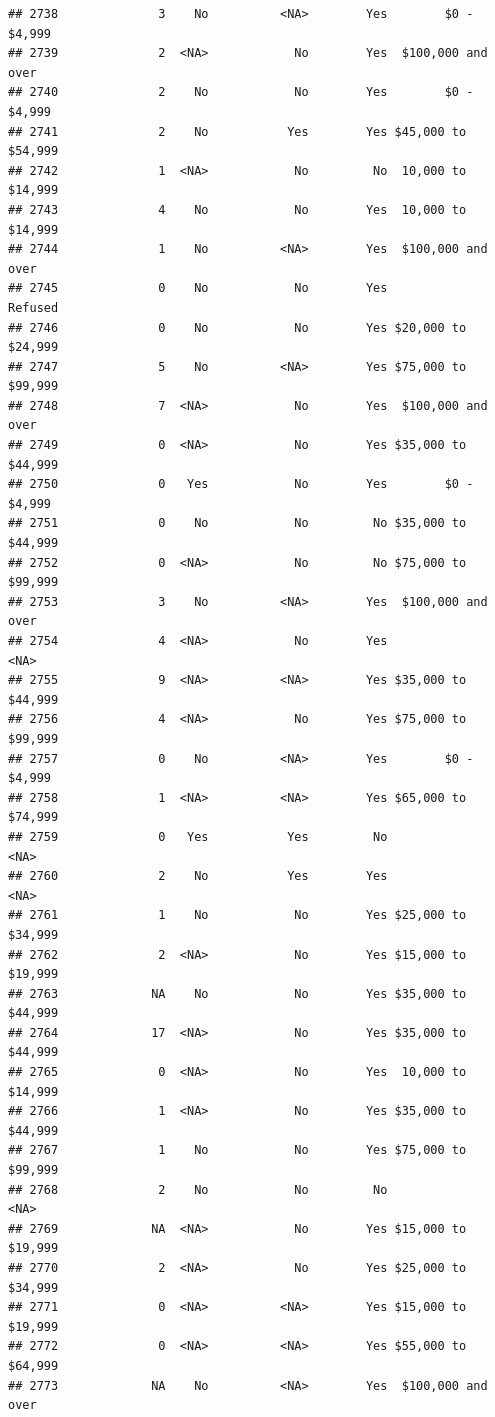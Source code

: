 \documentclass[man]{apa6}
\begin{document}
\begin{verbatim}
## 2738              3    No          <NA>        Yes        $0 - $4,999
## 2739              2  <NA>            No        Yes  $100,000 and over
## 2740              2    No            No        Yes        $0 - $4,999
## 2741              2    No           Yes        Yes $45,000 to $54,999
## 2742              1  <NA>            No         No  10,000 to $14,999
## 2743              4    No            No        Yes  10,000 to $14,999
## 2744              1    No          <NA>        Yes  $100,000 and over
## 2745              0    No            No        Yes            Refused
## 2746              0    No            No        Yes $20,000 to $24,999
## 2747              5    No          <NA>        Yes $75,000 to $99,999
## 2748              7  <NA>            No        Yes  $100,000 and over
## 2749              0  <NA>            No        Yes $35,000 to $44,999
## 2750              0   Yes            No        Yes        $0 - $4,999
## 2751              0    No            No         No $35,000 to $44,999
## 2752              0  <NA>            No         No $75,000 to $99,999
## 2753              3    No          <NA>        Yes  $100,000 and over
## 2754              4  <NA>            No        Yes               <NA>
## 2755              9  <NA>          <NA>        Yes $35,000 to $44,999
## 2756              4  <NA>            No        Yes $75,000 to $99,999
## 2757              0    No          <NA>        Yes        $0 - $4,999
## 2758              1  <NA>          <NA>        Yes $65,000 to $74,999
## 2759              0   Yes           Yes         No               <NA>
## 2760              2    No           Yes        Yes               <NA>
## 2761              1    No            No        Yes $25,000 to $34,999
## 2762              2  <NA>            No        Yes $15,000 to $19,999
## 2763             NA    No            No        Yes $35,000 to $44,999
## 2764             17  <NA>            No        Yes $35,000 to $44,999
## 2765              0  <NA>            No        Yes  10,000 to $14,999
## 2766              1  <NA>            No        Yes $35,000 to $44,999
## 2767              1    No            No        Yes $75,000 to $99,999
## 2768              2    No            No         No               <NA>
## 2769             NA  <NA>            No        Yes $15,000 to $19,999
## 2770              2  <NA>            No        Yes $25,000 to $34,999
## 2771              0  <NA>          <NA>        Yes $15,000 to $19,999
## 2772              0  <NA>          <NA>        Yes $55,000 to $64,999
## 2773             NA    No          <NA>        Yes  $100,000 and over

\end{verbatim}
\end{document}
